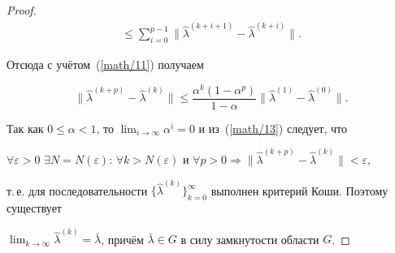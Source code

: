 \begin{proof}
\begin{multline}
\leq \sum_{i=0}^{p-1}\bigl\|\hat{\lambda}^{( k+i+1 ) }-\hat{\lambda}^{( k+i ) }\bigr\|.

\end{multline}

Отсюда с учётом~(\ref{math/11}) получаем










\begin{equation}

\label{math/13}

\bigl\|\hat{\lambda}^{( k+p ) }-\hat{\lambda}^{( k ) }\bigr\|\leq

\frac{\alpha^k( 1-\alpha^p ) }{1-\alpha}

\bigl\|\hat{\lambda}^{( 1 ) }-\hat{\lambda}^{( 0 ) }\bigr\|.

\end{equation}

    Так как  $0\leq\alpha<1$,  то $\lim_{i\to\infty}\alpha^i=0$\/ и из~(\ref{math/13}) следует,  что

    $\forall \varepsilon>0$ $\exists N=N( \varepsilon )$: $\forall k > N( \varepsilon ) $ и $\forall p>0 \Rightarrow \bigl\|\hat{\lambda}^{( k+p ) }-\hat{\lambda}^{( k ) }\bigr\|<\varepsilon$, 

т.\,е. для последовательности $\bigl\{ \hat{\lambda}^{( k ) } \bigr\}^\infty_{k=0}$  выполнен критерий Коши. Поэтому существует

    $\lim_{k\to\infty}\hat{\lambda}^{( k ) }=\bar{\lambda}$,  причём $\bar{\lambda}\in G$  в силу замкнутости области $G$.




\end{proof}
